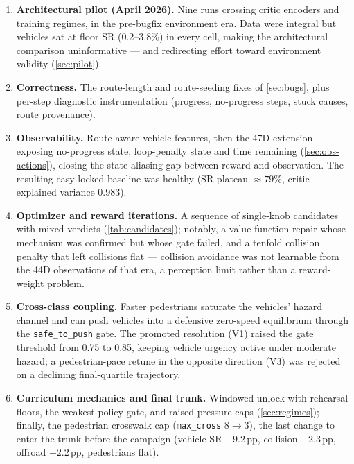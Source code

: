 \begin{enumerate}
  \item \textbf{Architectural pilot (April 2026).} Nine runs crossing
        critic encoders and training regimes, in the pre-bugfix
        environment era. Data were integral but vehicles sat at floor SR
        (0.2--3.8\%) in every cell, making the architectural comparison
        uninformative --- and redirecting effort toward environment
        validity (\cref{sec:pilot}).
  \item \textbf{Correctness.} The route-length and route-seeding fixes of
        \cref{sec:bugs}, plus per-step diagnostic instrumentation
        (progress, no-progress steps, stuck causes, route provenance).
  \item \textbf{Observability.} Route-aware vehicle features, then the
        47D extension exposing no-progress state, loop-penalty state and
        time remaining (\cref{sec:obs-actions}), closing the
        state-aliasing gap between reward and observation. The resulting
        easy-locked baseline was healthy (SR plateau $\approx 79$\%,
        critic explained variance 0.983).
  \item \textbf{Optimizer and reward iterations.} A sequence of
        single-knob candidates with mixed verdicts (\cref{tab:candidates});
        notably, a value-function repair whose mechanism was confirmed but
        whose gate failed, and a tenfold collision penalty that left
        collisions flat --- collision avoidance was not learnable from the
        44D observations of that era, a perception limit rather than a
        reward-weight problem.
  \item \textbf{Cross-class coupling.} Faster pedestrians saturate the
        vehicles' hazard channel and can push vehicles into a defensive
        zero-speed equilibrium through the \texttt{safe\_to\_push} gate.
        The promoted resolution (V1) raised the gate threshold from 0.75
        to 0.85, keeping vehicle urgency active under moderate hazard;
        a pedestrian-pace retune in the opposite direction (V3) was
        rejected on a declining final-quartile trajectory.
  \item \textbf{Curriculum mechanics and final trunk.} Windowed unlock
        with rehearsal floors, the weakest-policy gate, and raised
        pressure caps (\cref{sec:regimes}); finally, the pedestrian
        crosswalk cap (\texttt{max\_cross} $8 \to 3$), the last change to
        enter the trunk before the campaign (vehicle SR $+9.2$\,pp,
        collision $-2.3$\,pp, offroad $-2.2$\,pp, pedestrians flat).
\end{enumerate}

